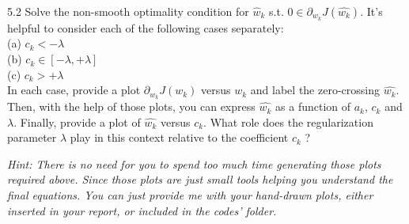 \documentclass{article}
\theoremstyle{definition}
\theoremstyle{definition}
\theoremstyle{remark}
\begin{document}
5.2 Solve the non-smooth optimality condition for $\hat{w}_{k}$ s.t. $0 \in \partial_{w_{k}}J(\hat{w_{k}})$. It's helpful to consider each of the following cases separately: \\
\qquad\qquad (a) $c_{k}<-\lambda$\\
\qquad\qquad (b) $c_{k}\in [-\lambda, +\lambda]$\\
\qquad\qquad (c) $c_{k}>+\lambda$\\
In each case, provide a plot $\partial_{w_{k}}J(w_{k})$ versus $w_{k}$ and label the zero-crossing $\hat{w_{k}}$. Then, with the help of those plots, you can express $\hat{w_{k}}$ as a function of $a_{k}$, $c_{k}$ and $\lambda$. Finally, provide a plot of $\hat{w_{k}}$ versus $c_{k}$. What role does the regularization parameter $\lambda$ play in this context relative to the coefficient $c_{k}$ ?

\emph{Hint: There is no need for you to spend too much time generating those plots required above. Since those plots are just small tools helping you understand the final equations. You can just provide me with your hand-drawn plots, either inserted in your report, or included in the codes' folder.}
\end{document}
